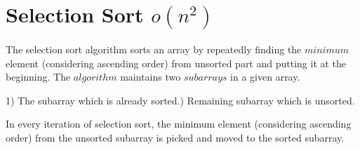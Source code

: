 \section{Selection Sort $o(n^2)$}



The selection sort algorithm sorts an array by repeatedly finding the $minimum$ element (considering ascending order) from unsorted part and putting it at the beginning. The $algorithm$ maintains two $subarrays$ in a given array.\newline

1) The subarray which is already sorted.) Remaining subarray which is unsorted.\newline

In every iteration of selection sort, the minimum element (considering ascending order) from the unsorted subarray is picked and moved to the sorted subarray.\newline
    
